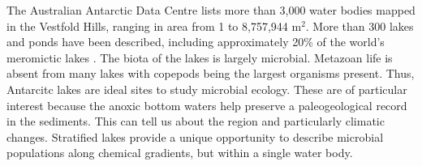 The Australian Antarctic Data Centre lists more than 3,000 water bodies mapped in the Vestfold Hills, ranging in area from 1 to 8,757,944 m$^2$. %
More than 300 lakes and ponds have been described, including approximately 20\% of the world's meromictic lakes \cite{Gibson1999}. %
The biota of the lakes is largely microbial. 
Metazoan life is absent from many lakes with copepods being the largest organisms present.
Thus, Antarcitc lakes are ideal sites to study microbial ecology.
These are of particular interest because the anoxic bottom waters help preserve a paleogeological record in the sediments.
This can tell us about the region and particularly climatic changes.
Stratified lakes provide a unique opportunity to describe microbial populations along chemical gradients, but within a single water body. 









